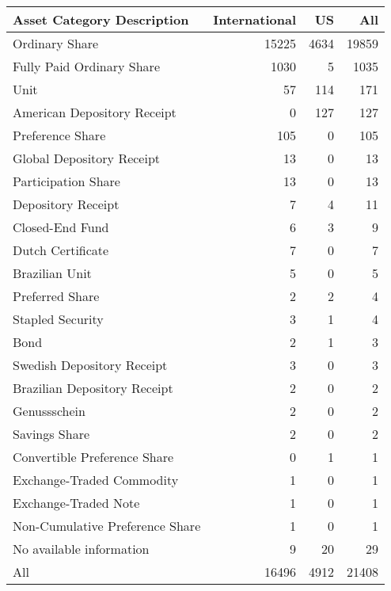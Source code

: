 \begin{tabular}{lrrr}
\toprule
Asset Category Description  &  International &    US &    All \\
\midrule
Ordinary Share                  &          15225 &  4634 &  19859 \\
Fully Paid Ordinary Share       &           1030 &     5 &   1035 \\
Unit                            &             57 &   114 &    171 \\
American Depository Receipt     &              0 &   127 &    127 \\
Preference Share                &            105 &     0 &    105 \\
Global Depository Receipt       &             13 &     0 &     13 \\
Participation Share             &             13 &     0 &     13 \\
Depository Receipt              &              7 &     4 &     11 \\
Closed-End Fund                 &              6 &     3 &      9 \\
Dutch Certificate               &              7 &     0 &      7 \\
Brazilian Unit                  &              5 &     0 &      5 \\
Preferred Share                 &              2 &     2 &      4 \\
Stapled Security                &              3 &     1 &      4 \\
Bond                            &              2 &     1 &      3 \\
Swedish Depository Receipt      &              3 &     0 &      3 \\
Brazilian Depository Receipt    &              2 &     0 &      2 \\
Genussschein                    &              2 &     0 &      2 \\
Savings Share                   &              2 &     0 &      2 \\
Convertible Preference Share    &              0 &     1 &      1 \\
Exchange-Traded Commodity       &              1 &     0 &      1 \\
Exchange-Traded Note            &              1 &     0 &      1 \\
Non-Cumulative Preference Share &              1 &     0 &      1 \\
No available information        &              9 &    20 &     29 \\
\midrule
All                             &          16496 &  4912 &  21408 \\
\bottomrule
\end{tabular}
